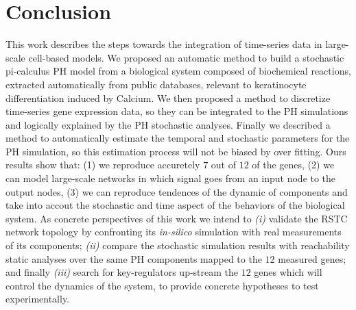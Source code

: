 \section{Conclusion}
This work describes the steps towards the integration of time-series data in large-scale cell-based models. 
We proposed an automatic method to build a stochastic pi-calculus PH model from a biological system composed of biochemical reactions, extracted automatically from public databases, 
relevant to keratinocyte differentiation induced by Calcium. 
We then proposed a method to discretize time-series gene expression data, so they can be integrated to the PH simulations and logically explained by the PH stochastic analyses. 
Finally we described a method to automatically estimate the temporal and stochastic
parameters for the PH simulation, so this estimation process will not be biased by over fitting. Ours results show that: (1) we reproduce accuretely  
$7$ out of $12$ of the genes, (2) we can model large-scale networks in which signal goes from an input node to the output nodes, (3) we can reproduce tendences of the dynamic of components
and take into accout the stochastic and time aspect of the behaviors of the biological system.
As concrete perspectives of this work we intend to \emph{(i)} validate the RSTC network topology by confronting its \emph{in-silico} simulation with real measurements of its components;
\emph{(ii)} compare the stochastic simulation results with reachability static analyses over the same PH components mapped to the $12$ measured genes; and 
finally \emph{(iii)} search for key-regulators up-stream the $12$ genes which will control the dynamics of the system, to  provide  concrete 
hypotheses to test experimentally.
